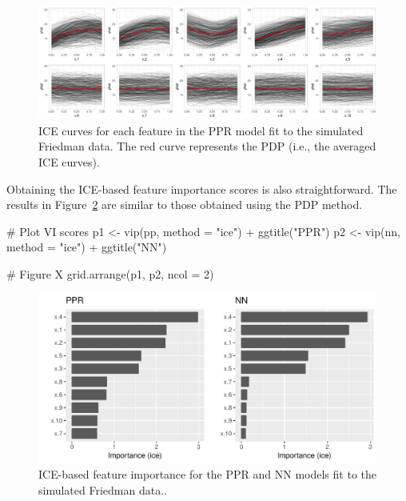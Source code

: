 
\begin{figure}[!htb]
  \centering 
  \includegraphics[width=1\linewidth]{figures/ice-ppr} 
  \caption{ICE curves for each feature in the PPR model fit to the simulated Friedman data. The red curve represents the PDP (i.e., the averaged ICE curves).}
  \label{fig:ice-ppr}
\end{figure}

Obtaining the ICE-based feature importance scores is also straightforward. The results in Figure~\ref{fig:vip-ice-ppr-nn} are similar to those obtained using the PDP method.

\begin{example}
# Plot VI scores
p1 <- vip(pp, method = "ice") + ggtitle("PPR")
p2 <- vip(nn, method = "ice") + ggtitle("NN")

# Figure X
grid.arrange(p1, p2, ncol = 2)
\end{example}

\begin{figure}[!htb]
  \centering 
  \includegraphics[width=1\linewidth]{figures/vip-ice-ppr-nn} 
  \caption{ICE-based feature importance for the PPR and NN models fit to the simulated Friedman data..}
  \label{fig:vip-ice-ppr-nn}
\end{figure}


